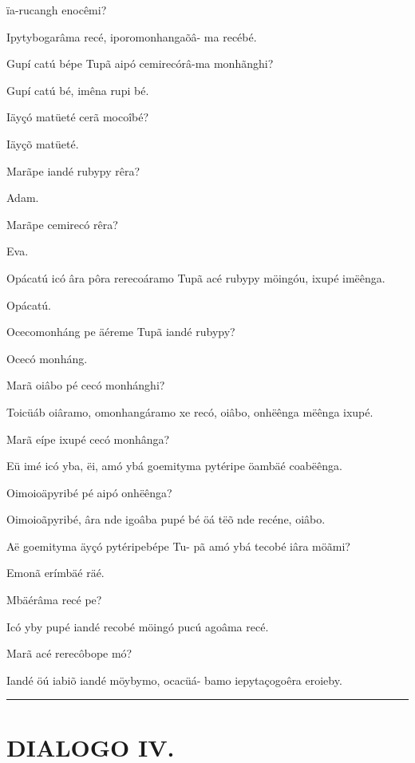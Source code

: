 \documentclass[openany,titlepage,12pt]{book}
\begin{document}
\begin{altereven}
    ïa-rucangh enocêmi?
    \item Ipytybogarâma recé, iporomonhangaõâ-
    ma recébé.
    \item Gupí catú bépe Tupã aipó
    cemirecórâ-ma monhãnghi? \newpage
    \item Gupí catú bé, imêna rupi bé.
    \item Iäyçó matüeté cerã mocoîbé?
    \item Iäyçõ matüeté.
    \item Marãpe iandé rubypy rêra?
    \item Adam.
    \item Marãpe cemirecó rêra?
    \item Eva.
    \item Opácatú icó âra pôra rerecoáramo Tupã
    acé rubypy möingóu, ixupé imëênga.
    \item Opácatú.
    \item Ocecomonháng pe äéreme Tupã iandé
    rubypy?
    \item Ocecó monháng.
    \item Marã oiâbo pé cecó monhánghi?
    \item Toicüáb oiâramo, omonhangáramo xe
    recó, oiâbo, onhëênga mëênga ixupé.
    \item Marã eípe ixupé cecó monhânga?
    \item Eü imé icó yba, ëi, amó ybá goemityma
    pytéripe öambäé coabëênga.
    \item Oimoioäpyribé pé aipó onhëênga?
    \item Oimoioãpyribé, âra nde igoâba pupé bé
    öá tëõ nde recéne, oiâbo.
    \item Aë goemityma äyçó pytéripebépe Tu-
    pã amó ybá tecobé iâra möãmi?
    \item Emonã erímbäé räé.
    \item Mbäérâma recé pe?
    \item Icó yby pupé iandé recobé möingó pucú
    agoâma recé.\newpage
    \item Marã acé rerecôbope mó?
    \item Iandé öú iabiõ iandé möybymo, ocacüá-
    bamo iepytaçogoêra eroieby.
\end{altereven}

\vspace{2pt}
\par\noindent\rule{\textwidth}{0.4pt}
\unskip\vspace*{4pt}
\section{DIALOGO IV.}
\end{document}
